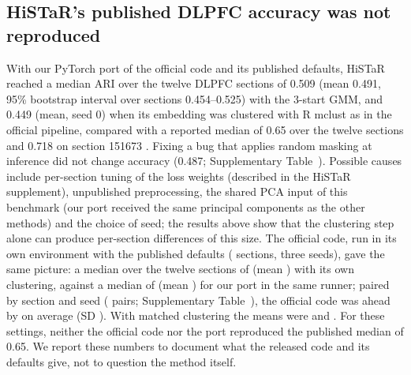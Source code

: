 \documentclass[unnumsec,webpdf,contemporary,large]{oup-authoring-template}
\begin{document}
\subsection{HiSTaR's published DLPFC accuracy was not reproduced}
With our PyTorch port of the official code and its published defaults, HiSTaR reached a median ARI over the twelve DLPFC sections of
0.509 (mean 0.491, 95\% bootstrap interval over sections 0.454--0.525) with the 3-start GMM, and 0.449 (mean, seed 0)
when its embedding was clustered with R mclust as in the official pipeline, compared with a reported
median of 0.65 over the twelve sections and 0.718 on section 151673 \citep{yu2025histar}. Fixing a bug that applies random masking at inference did not change accuracy (0.487; Supplementary Table~\SThistar).
Possible causes include per-section tuning of the loss weights (described in the HiSTaR supplement), unpublished preprocessing,
the shared PCA input of this benchmark (our port received the same principal components as the other methods) and the choice of
seed; the results above show that the clustering step alone can produce per-section differences of this size.
The official code, run in its own environment with the published defaults (\rvMsixN{} sections, three seeds), gave the same picture:
a median over the twelve sections of \vsHistarOffMed{} (mean \vsHistarOffMean) with its own clustering, against a median of
\vsHistarPortMed{} (mean \vsHistarPortMean) for our port in the same runner; paired by section and seed (\vsHistarPairs{} pairs; Supplementary
Table~\SThistarpairs), the official code was ahead by \vsHistarDiffMean{} on average (SD \vsHistarDiffSD). With matched clustering the means
were \rvMsixOffMat{} and \rvMsixOursMat. For these settings, neither the official code nor the port reproduced the published median of 0.65. We report these numbers to document what the released code and its defaults give, not to question
the method itself.
\end{document}
